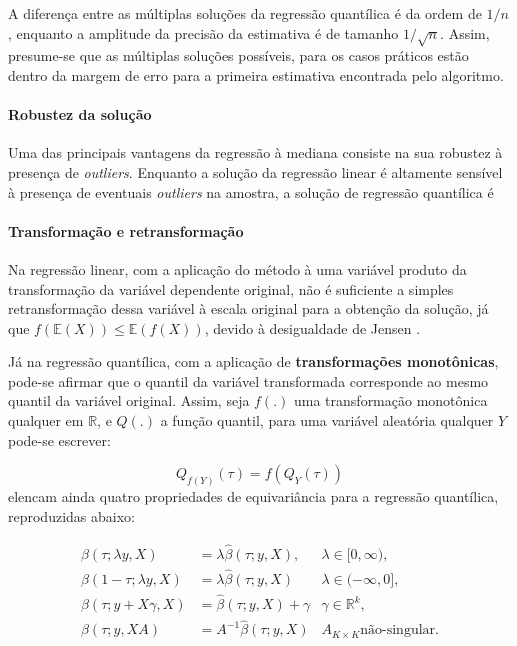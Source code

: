 \documentclass[a4paper, 12pt]{article}
\let\oldparagraph\paragraph
\renewcommand{\paragraph}[1]{\oldparagraph{#1}\mbox{}}
\begin{document}
A diferença entre as múltiplas soluções da regressão quantílica é da
ordem de \(1/n\), enquanto a amplitude da precisão da estimativa é de
tamanho \(1/\sqrt{n}\). Assim, presume-se que as múltiplas soluções
possíveis, para os casos práticos estão dentro da margem de erro para a
primeira estimativa encontrada pelo algoritmo.

\hypertarget{robustez-da-solucao}{%
\paragraph{Robustez da solução}\label{robustez-da-solucao}}

Uma das principais vantagens da regressão à mediana consiste na sua
robustez à presença de \emph{outliers}. Enquanto a solução da regressão
linear é altamente sensível à presença de eventuais \emph{outliers} na
amostra, a solução de regressão quantílica é

\hypertarget{transformacao-e-retransformacao}{%
\paragraph{Transformação e
retransformação}\label{transformacao-e-retransformacao}}

Na regressão linear, com a aplicação do método à uma variável produto da
transformação da variável dependente original, não é suficiente a
simples retransformação dessa variável à escala original para a obtenção
da solução, já que \(f(\mathbb{E}(X)) \leq \mathbb{E}(f(X))\), devido à
desigualdade de Jensen \autocite[ver][p.~207]{moda_media_mediana}.

Já na regressão quantílica, com a aplicação de \textbf{transformações
monotônicas}, pode-se afirmar que o quantil da variável transformada
corresponde ao mesmo quantil da variável original. Assim, seja \(f(.)\)
uma transformação monotônica qualquer em \(\mathbb{R}\), e \(Q(.)\) a
função quantil, para uma variável aleatória qualquer \(Y\) pode-se
escrever:

\[Q_{f(Y)}(\tau) = f(Q_Y(\tau))\] \textcite[p.~39-40]{koenker1978}
elencam ainda quatro propriedades de equivariância para a regressão
quantílica, reproduzidas abaixo:

\[
\begin{aligned}
\hat \beta(\tau;\lambda y,X) &= \lambda \hat \beta(\tau; y, X), & \lambda \in[0,\infty), \\
\hat \beta(1-\tau;\lambda y,X) &= \lambda \hat \beta(\tau; y, X) & \lambda \in (-\infty,0],\\
\hat \beta(\tau;y + X\gamma,X)& = \hat \beta(\tau; y, X) + \gamma & \gamma \in \mathbb{R}^k,\\
\hat \beta(\tau;y,XA) &= A^{-1} \hat \beta(\tau; y, X) & A_{K \times K} \text{não-singular.}
\end{aligned}
\]
\end{document}
